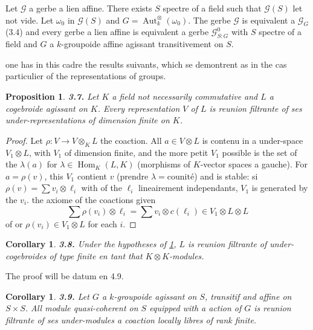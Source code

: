 \documentclass[12pt,a4paper]{article}
\theoremstyle{plain}
\newtheorem{proposition}[theorem]{Proposition}
\newtheorem{corollary}[theorem]{Corollary}
\theoremstyle{definition}
\theoremstyle{remark}
\DeclareMathOperator{\Hom}{Hom}
\DeclareMathOperator{\Aut}{Aut}
\begin{document}
Let $\mathcal{G}$ a gerbe a lien affine. There exists $S$ spectre of a field such that $\mathcal{G}(S)$ let not vide. Let $\omega_0$ in $\mathcal{G}(S)$ and $G = \Aut^\otimes_k(\omega_0)$. The gerbe $\mathcal{G}$ is equivalent a $\mathcal{G}_G$ (3.4) and every gerbe a lien affine is equivalent a gerbe $\mathcal{G}^0_{S:G}$ with $S$ spectre of a field and $G$ a $k$-groupoide affine agissant transitivement on $S$.

one has in this cadre the results suivants, which se demontrent as in the cas particulier of the representations of groups.

\begin{proposition}\label{prop:3.7}
\textbf{3.7.} Let $K$ a field not necessarily commutative and $L$ a cogebroide agissant on $K$. Every representation $V$ of $L$ is reunion filtrante of ses under-representations of dimension finite on $K$.
\end{proposition}

\begin{proof}
Let $\rho : V \to V \otimes_K L$ the coaction. All $a \in V \otimes L$ is contenu in a under-space $V_1 \otimes L$, with $V_1$ of dimension finite, and the more petit $V_1$ possible is the set of the $\lambda(a)$ for $\lambda \in \Hom_K(L,K)$ (morphisms of $K$-vector spaces a gauche). For $a = \rho(v)$, this $V_1$ contient $v$ (prendre $\lambda = \text{counité}$) and is stable: si $\rho(v) = \sum v_i \otimes \ell_i$ with of the $\ell_i$ lineairement independants, $V_1$ is generated by the $v_i$. the axiome of the coactions given
\[
\sum \rho(v_i) \otimes \ell_i = \sum v_i \otimes c(\ell_i) \in V_1 \otimes L \otimes L
\]
of or $\rho(v_i) \in V_1 \otimes L$ for each $i$.
\end{proof}

\begin{corollary}\label{cor:3.8}
\textbf{3.8.} Under the hypotheses of \ref{prop:3.7}, $L$ is reunion filtrante of under-cogebroides of type finite en tant that $K \otimes K$-modules.
\end{corollary}

The proof will be datum en 4.9.

\begin{corollary}\label{cor:3.9}
\textbf{3.9.} Let $G$ a $k$-groupoide agissant on $S$, transitif and affine on $S \times S$. All module quasi-coherent on $S$ equipped with a action of $G$ is reunion filtrante of ses under-modules a coaction locally libres of rank finite.
\end{corollary}
\end{document}
